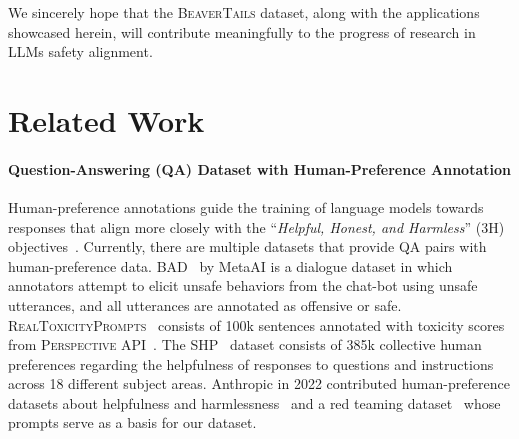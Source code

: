 \documentclass{article}
\begin{document}
We sincerely hope that the \textsc{BeaverTails} dataset, along with the applications showcased herein, will contribute meaningfully to the progress of research in LLMs safety alignment.



\vspace{-0.5em}
\section{Related Work} \label{sec:related_work}
\vspace{-0.5em}
\paragraph{Question-Answering (QA) Dataset with Human-Preference Annotation} Human-preference annotations guide the training of language models towards responses that align more closely with the ``\textit{Helpful, Honest, and Harmless}'' (3H) objectives~\cite{3h-2021, Bai2022-mt}. Currently, there are multiple datasets that provide QA pairs with human-preference data.
\textsc{BAD}~\cite{Xu2021-ce} by MetaAI is a dialogue dataset in which annotators attempt to elicit unsafe behaviors from the chat-bot using unsafe utterances, and all utterances are annotated as offensive or safe. 
\textsc{RealToxicityPrompts}~\cite{Gehman2020-zq} consists of 100k sentences annotated with toxicity scores from \textsc{Perspective API}~\cite{Jigsaw2017-jh, Lees2022-at}. 
The \textsc{SHP}~\cite{SHP} dataset consists of 385k collective human preferences regarding the helpfulness of responses to questions and instructions across 18 different subject areas.
Anthropic in 2022 contributed human-preference datasets about helpfulness and harmlessness~\cite{Bai2022-mt} and a red teaming dataset~\cite{Ganguli2022-td} whose prompts serve as a basis for our dataset.

\vspace{-1.em}
\end{document}
